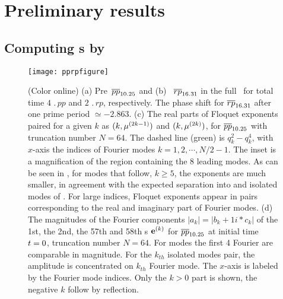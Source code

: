 
\section{Preliminary results}
\label{sec:done}

\subsection{Computing \Fv s by \Ped}
\label{subsec:PE}

\begin{figure}[h]
  \centering
  \texttt{[image: pprpfigure]}
  \caption{(Color online)
   (a) Pre\po\ $\cycle{pp}_{10.25}$ and
   (b) \rpo\ $\cycle{rp}_{16.31}$ in the full \statesp\ for total time
   $4\,\period{pp}$ and $2\,\period{rp}$, respectively. The phase shift
   for $\cycle{rp}_{16.31}$ after one prime period $\simeq-2.863$.
   (c) The real parts of Floquet exponents paired for a given $k$ as
   $(k,\eigRe[2k-1])$ and $(k,\eigRe[2k])$, for $\cycle{pp}_{10.25}$ with
   truncation number $N=64$. The dashed line (green) is
   $q_{k}^{2}-q_{k}^{4}$, with $x$-axis the indices of Fourier modes
   $k=1,2,\cdots,N/2-1$. The inset is a magnification of the region
   containing the 8 leading {\entangled} modes. As can be seen in
   , for modes that follow, $k\geq 5$,
   the exponents are much smaller, in
   agreement with the expected separation into {\entangled} and
   {isolated} modes of . For large
   indices, Floquet exponents
   appear in pairs corresponding to the real and imaginary
   part of Fourier modes.
   (d) The magnitudes of the Fourier components $|a_k| =
   |b_k+1i*c_k|$ of the 1st, the 2nd, the 57th and 58th \Fv s
   $\jEigvec[k]$ for $\cycle{pp}_{10.25}$ at initial time $\zeit =0$,
   truncation number $N=64$. For {\entangled} modes the first 4 Fourier
   are comparable in magnitude. For the $k_{th}$ isolated modes pair, the
   amplitude is concentrated on $k_{th}$ Fourier mode. The $x$-axis is
   labeled by the Fourier mode indices. Only the $k>0$ part is shown, the
   negative $k$ follow by reflection.
   }
  \label{fig:ppo1state}
\end{figure}

